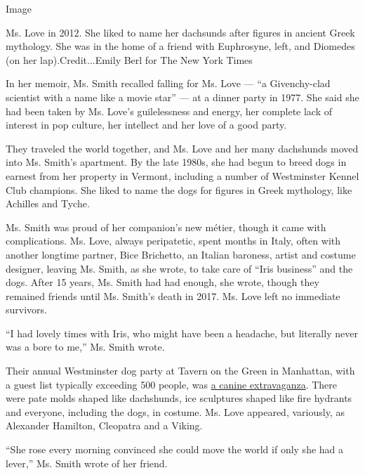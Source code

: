 Image

Ms. Love in 2012. She liked to name her dachsunds after figures in
ancient Greek mythology. She was in the home of a friend with
Euphrosyne, left, and Diomedes (on her lap).Credit...Emily Berl for The
New York Times

In her memoir, Ms. Smith recalled falling for Ms. Love --- ``a
Givenchy-clad scientist with a name like a movie star'' --- at a dinner
party in 1977. She said she had been taken by Ms. Love's guilelessness
and energy, her complete lack of interest in pop culture, her intellect
and her love of a good party.

They traveled the world together, and Ms. Love and her many dachshunds
moved into Ms. Smith's apartment. By the late 1980s, she had begun to
breed dogs in earnest from her property in Vermont, including a number
of Westminster Kennel Club champions. She liked to name the dogs for
figures in Greek mythology, like Achilles and Tyche.

Ms. Smith was proud of her companion's new métier, though it came with
complications. Ms. Love, always peripatetic, spent months in Italy,
often with another longtime partner, Bice Brichetto, an Italian
baroness, artist and costume designer, leaving Ms. Smith, as she wrote,
to take care of ``Iris business'' and the dogs. After 15 years, Ms.
Smith had had enough, she wrote, though they remained friends until Ms.
Smith's death in 2017. Ms. Love left no immediate survivors.

``I had lovely times with Iris, who might have been a headache, but
literally never was a bore to me,'' Ms. Smith wrote.

Their annual Westminster dog party at Tavern on the Green in Manhattan,
with a guest list typically exceeding 500 people, was
\href{https://www.nytimes3xbfgragh.onion/1996/02/18/style/in-westminster-show-season-dogs-are-party-animals.html}{a
canine extravaganza}. There were pate molds shaped like dachshunds, ice
sculptures shaped like fire hydrants and everyone, including the dogs,
in costume. Ms. Love appeared, variously, as Alexander Hamilton,
Cleopatra and a Viking.

``She rose every morning convinced she could move the world if only she
had a lever,'' Ms. Smith wrote of her friend.

\href{https://www.nytimes3xbfgragh.onion/interactive/2020/obituaries/people-died-coronavirus-obituaries.html?action=click\&pgtype=Article\&state=default\&region=BELOW_MAIN_CONTENT\&context=covid_obits_promo}{}


